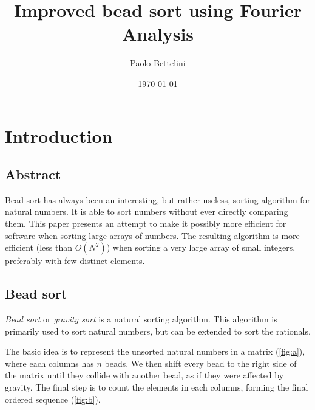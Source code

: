 \documentclass{article}
\title{Improved bead sort using Fourier Analysis}
\author{Paolo Bettelini}
\date{\today}
\begin{document}
\maketitle
\tableofcontents
\pagebreak

\section{Introduction}

\subsection{Abstract}

Bead sort has always been an interesting, but rather useless, sorting algorithm
for natural numbers. It is able to sort numbers without ever directly comparing them.
This paper presents an attempt to make it possibly more efficient
for software when sorting large arrays of numbers.
The resulting algorithm is more efficient (less than \(O(N^2)\)) when sorting a very large array of small integers,
preferably with few distinct elements.

\subsection{Bead sort}

\textit{Bead sort}\cite{beadsort} or \textit{gravity sort}
is a natural sorting algorithm.
This algorithm is primarily used to sort
natural numbers, but can be extended to sort the rationals.

The basic idea is to represent the unsorted natural numbers
in a matrix (\ref{fig:a}), where each columns has \(n\) beads.
We then shift every bead to the right side of the matrix
until they collide with another bead,
as if they were affected by gravity.
The final step is to count the elements in each columns,
forming the final ordered sequence (\ref{fig:b}).
\end{document}
